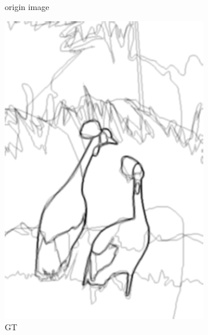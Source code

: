 \documentclass[a4paper]{ctexart}
\begin{document}
\begin{figure}[htb]
\begin{subfigure}{0.2\textwidth}
			\captionsetup{font=scriptsize}
			\caption{origin image}
			\label{fig: origin image}
		\end{subfigure}
		\begin{subfigure}{0.2\textwidth}
			\includegraphics[width=\linewidth]{picture/LLIE/RCF/GT}
			\captionsetup{font=scriptsize}
			\caption{GT}
			\label{fig: RCF_GT}
		\end{subfigure}
		\begin{subfigure}{0.2\textwidth}

\end{subfigure}
\end{figure}
\end{document}
